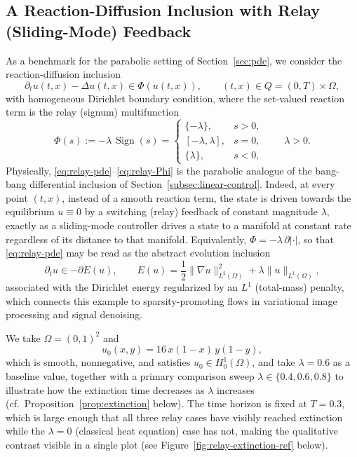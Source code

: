 \documentclass[11pt]{elsarticle}
\theoremstyle{definition}
\theoremstyle{remark}
\numberwithin{equation}{section}
\DeclareMathOperator{\Sign}{Sign}
\begin{document}
\subsection{A Reaction-Diffusion Inclusion with Relay (Sliding-Mode) Feedback}
\label{subsec:parabolic-PDI}

As a benchmark for the parabolic setting of Section~\ref{sec:pde},
we consider the reaction-diffusion inclusion
\begin{equation}
	\label{eq:relay-pde}
	\partial_t u(t,x) - \Delta u(t,x) \in \Phi(u(t,x)),
	\qquad (t,x)\in Q = (0,T)\times\Omega,
\end{equation}
with homogeneous Dirichlet boundary condition, where
the set-valued reaction term is the relay (signum) multifunction
\begin{equation}
	\label{eq:relay-Phi}
	\Phi(s) := -\lambda\,\Sign(s)
	=
	\begin{cases}
		\{-\lambda\}, & s>0,\\[2pt]
		[-\lambda,\lambda], & s=0,\\[2pt]
		\{\lambda\}, & s<0,
	\end{cases}
	\qquad \lambda>0.
\end{equation}
Physically, \eqref{eq:relay-pde}--\eqref{eq:relay-Phi} is the parabolic
analogue of the bang-bang differential inclusion of
Section~\ref{subsec:linear-control}. Indeed, at every point $(t,x)$, instead of a
smooth reaction term, the state is driven towards the equilibrium $u\equiv0$
by a switching (relay) feedback of constant magnitude $\lambda$, exactly as
a sliding-mode controller drives a state to a manifold at constant rate
regardless of its distance to that manifold. Equivalently, $\Phi=-\lambda\,\partial|\cdot|$, so that \eqref{eq:relay-pde}
may be read as the abstract evolution inclusion
\begin{equation}
	\label{eq:relay-gradient-flow}
	\partial_t u \in -\partial E(u),
	\qquad
	E(u) = \frac12\|\nabla u\|_{L^2(\Omega)}^2 + \lambda\|u\|_{L^1(\Omega)},
\end{equation}
associated with the Dirichlet energy regularized by an $L^1$ (total-mass)
penalty, which connects this example to sparsity-promoting flows in
variational image processing and signal denoising.

We take $\Omega=(0,1)^2$ and
\begin{equation}
	\label{eq:relay-u0}
	u_0(x,y) = 16\,x(1-x)\,y(1-y),
\end{equation}
which is smooth, nonnegative, and satisfies $u_0\in H_0^1(\Omega)$, and take
$\lambda=0.6$ as a baseline value, together with a primary comparison sweep
$\lambda\in\{0.4,0.6,0.8\}$ to illustrate how the extinction time decreases
as $\lambda$ increases (cf.\ Proposition~\ref{prop:extinction} below). The time horizon is fixed at $T=0.3$, which
is large enough that all three relay cases have visibly reached extinction while
the $\lambda=0$ (classical heat equation) case has not, making the qualitative
contrast visible in a single plot (see Figure~\ref{fig:relay-extinction-ref} below).
\end{document}
